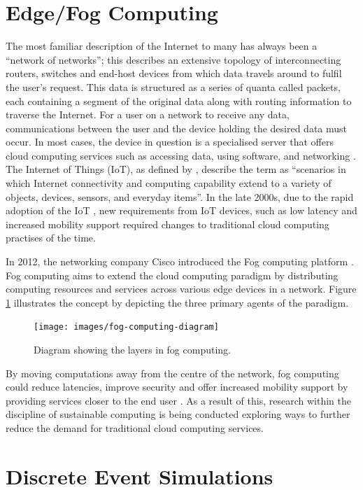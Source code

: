 \documentclass{l4proj}
\begin{document}
\section{Edge/Fog Computing}
The most familiar description of the Internet to many has always been a ``network of networks''; this describes an extensive topology of interconnecting routers, switches and end-host devices from which data travels around to fulfil the user's request.
This data is structured as a series of quanta called packets, each containing a segment of the original data along with routing information to traverse the Internet.
For a user on a network to receive any data, communications between the user and the device holding the desired data must occur.
In most cases, the device in question is a specialised server that offers cloud computing services such as accessing data, using software, and networking \citep{cloud_computing}.
The Internet of Things (IoT), as defined by \cite{iot}, describe the term as ``scenarios in which Internet connectivity and computing capability extend to a variety of objects, devices, sensors, and everyday items''.
In the late 2000s, due to the rapid adoption of the IoT \citep{iotboom}, new requirements from IoT devices, such as low latency and increased mobility support \citep{fog_computing} required changes to traditional cloud computing practises of the time.

In 2012, the networking company Cisco introduced the Fog computing platform \citep{fog_computing}.
Fog computing aims to extend the cloud computing paradigm by distributing computing resources and services across various edge devices in a network.
Figure \ref{fig:fog-diagram} illustrates the concept by depicting the three primary agents of the paradigm.
\begin{figure}[h]
    \centering
    \texttt{[image: images/fog-computing-diagram]}
    ~
    \caption{Diagram showing the layers in fog computing.}
    \label{fig:fog-diagram}
\end{figure}
By moving computations away from the centre of the network, fog computing could reduce latencies, improve security and offer increased mobility support by providing services closer to the end user \citep{fog_computing}.
As a result of this, research within the discipline of sustainable computing \citep{sustainableFog} is being conducted exploring ways to further reduce the demand for traditional cloud computing services.

\section{Discrete Event Simulations}
\end{document}
